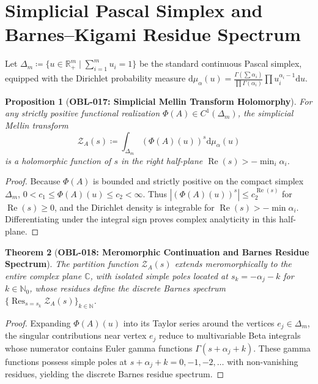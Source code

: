 \documentclass[11pt,a4paper,reqno]{amsart}
\newtheorem{theorem}{Theorem}[section]
\newtheorem{proposition}[theorem]{Proposition}
\theoremstyle{definition}
\theoremstyle{remark}
\numberwithin{equation}{section}
\newcommand{\dif}{\mathrm{d}}
\begin{document}
\section{Simplicial Pascal Simplex and Barnes--Kigami Residue Spectrum}
\label{sec:simplicial}

Let $\Delta_m \coloneqq \{ u \in \mathbb{R}_+^m \mid \sum_{i=1}^m u_i = 1 \}$ be the standard continuous Pascal simplex, equipped with the Dirichlet probability measure $\dif\mu_\alpha(u) = \frac{\Gamma(\sum \alpha_i)}{\prod \Gamma(\alpha_i)} \prod u_i^{\alpha_i - 1} \dif u$.

\begin{proposition}[\textbf{OBL-017: Simplicial Mellin Transform Holomorphy}]
\label{prop:simplicial_mellin_conv}
For any strictly positive functional realization $\Phi(A) \in C^1(\Delta_m)$, the simplicial Mellin transform
\begin{equation}
\mathcal{Z}_A(s) \coloneqq \int_{\Delta_m} \left( \Phi(A)(u) \right)^s \dif\mu_\alpha(u)
\end{equation}
is a holomorphic function of $s$ in the right half-plane $\operatorname{Re}(s) > -\min_i \alpha_i$.
\end{proposition}

\begin{proof}
Because $\Phi(A)$ is bounded and strictly positive on the compact simplex $\Delta_m$, $0 < c_1 \le \Phi(A)(u) \le c_2 < \infty$. Thus $|(\Phi(A)(u))^s| \le c_2^{\operatorname{Re}(s)}$ for $\operatorname{Re}(s) \ge 0$, and the Dirichlet density is integrable for $\operatorname{Re}(s) > -\min \alpha_i$. Differentiating under the integral sign proves complex analyticity in this half-plane.
\end{proof}

\begin{theorem}[\textbf{OBL-018: Meromorphic Continuation and Barnes Residue Spectrum}]
\label{thm:barnes_meromorphic_continuation}
The partition function $\mathcal{Z}_A(s)$ extends meromorphically to the entire complex plane $\mathbb{C}$, with isolated simple poles located at $s_k = -\alpha_j - k$ for $k \in \mathbb{N}_0$, whose residues define the discrete Barnes spectrum $\{\operatorname{Res}_{s = s_k} \mathcal{Z}_A(s)\}_{k \in \mathbb{N}}$.
\end{theorem}

\begin{proof}
Expanding $\Phi(A)(u)$ into its Taylor series around the vertices $e_j \in \Delta_m$, the singular contributions near vertex $e_j$ reduce to multivariable Beta integrals whose numerator contains Euler gamma functions $\Gamma(s + \alpha_j + k)$. These gamma functions possess simple poles at $s + \alpha_j + k = 0, -1, -2, \dots$ with non-vanishing residues, yielding the discrete Barnes residue spectrum.
\end{proof}
\end{document}
